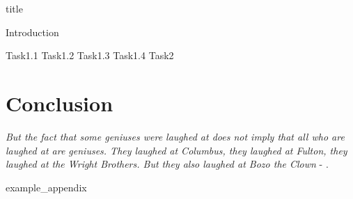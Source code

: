 \documentclass{article}
\begin{document}
{title}

\frontmatter

\tableofcontents

\listoffigures
\listoftables

\mainmatter

{Introduction}

{Task1.1}
{Task1.2}
{Task1.3}
{Task1.4}
{Task2}


\section{Conclusion}
\textit{But the fact that some geniuses were laughed at does not imply that all who are laughed at are geniuses. They laughed at Columbus, they laughed at Fulton, they laughed at the Wright Brothers. But they also laughed at Bozo the Clown} -  \textcite{sagan_1993}.

\newpage
\printbibliography[heading = bibintoc, title = Bibliography]    %

\addappendix
{example_appendix}

\end{document}

